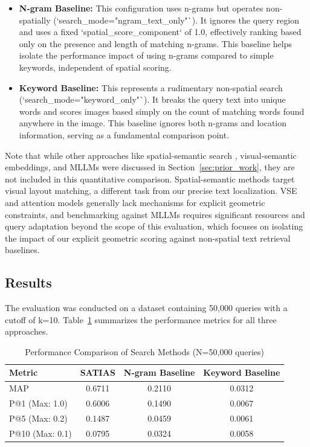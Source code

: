 \documentclass[manuscript,screen]{acmart}
\begin{document}
\begin{itemize}
    \item \textbf{N-gram Baseline:} This configuration uses n-grams but operates non-spatially (`search\_mode="ngram\_text\_only"`). It ignores the query region and uses a fixed `spatial\_score\_component` of 1.0, effectively ranking based only on the presence and length of matching n-grams. This baseline helps isolate the performance impact of using n-grams compared to simple keywords, independent of spatial scoring.
    \item \textbf{Keyword Baseline:} This represents a rudimentary non-spatial search (`search\_mode="keyword\_only"`). It breaks the query text into unique words and scores images based simply on the count of matching words found anywhere in the image. This baseline ignores both n-grams and location information, serving as a fundamental comparison point.
\end{itemize}

Note that while other approaches like spatial-semantic search \cite{Mai17}, visual-semantic embeddings, and MLLMs \cite{Huang24, Yin24} were discussed in Section~\ref{sec:prior_work}, they are not included in this quantitative comparison. Spatial-semantic methods target visual layout matching, a different task from our precise text localization. VSE and attention models generally lack mechanisms for explicit geometric constraints, and benchmarking against MLLMs requires significant resources and query adaptation beyond the scope of this evaluation, which focuses on isolating the impact of our explicit geometric scoring against non-spatial text retrieval baselines.

\subsection{Results}
\label{sec:results}

The evaluation was conducted on a dataset containing 50,000 queries with a cutoff of k=10. Table~\ref{tab:results} summarizes the performance metrics for all three approaches.

\begin{table}[t]
    \centering
    \caption{Performance Comparison of Search Methods (N=50,000 queries)}
    \label{tab:results}
    \begin{tabular}{lccc}
        \toprule
        \textbf{Metric} & \textbf{SATIAS} & \textbf{N-gram Baseline} & \textbf{Keyword Baseline} \\
        \midrule
        MAP             & 0.6711          & 0.2110                   & 0.0312                    \\
        \midrule %
        P@1 (Max: 1.0)  & 0.6006          & 0.1490                   & 0.0067                    \\
        P@5 (Max: 0.2)  & 0.1487          & 0.0459                   & 0.0061                    \\
        P@10 (Max: 0.1) & 0.0795          & 0.0324                   & 0.0058                    \\
        \bottomrule
    \end{tabular}
\end{table}
\end{document}

